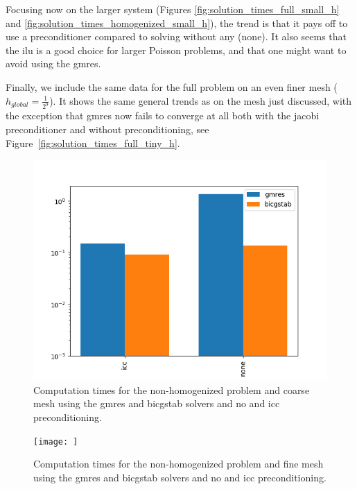 \documentclass{article}
\begin{document}
  Focusing now on the larger system (Figures \ref{fig:solution_times_full_small_h} and \ref{fig:solution_times_homogenized_small_h}), the trend is that it pays off to use a preconditioner compared to solving without any (none). It also seems that the ilu is a good choice for larger Poisson problems, and that one might want to avoid using the gmres.

  Finally, we include the same data for the full problem on an even finer mesh ($h_{global}=\frac{1}{2^9}$). It shows the same general trends as on the mesh just discussed, with the exception that gmres now fails to converge at all both with the jacobi preconditioner and without preconditioning, see Figure~\ref{fig:solution_times_full_tiny_h}. 
\begin{figure}[h]
    \centering
    \includegraphics[width=0.8\linewidth]{solution_times_icc_big_h.png}
    \caption{Computation times for the non-homogenized problem and coarse mesh using the gmres and bicgstab solvers and no and icc preconditioning.}
    \label{fig:solution_times_icc_big_h}
  \end{figure}
  \begin{figure}[h]
    \centering
    \texttt{[image: ]}%
    \caption{Computation times for the non-homogenized problem and fine mesh using the gmres and bicgstab solvers and no and icc preconditioning.}
    \label{fig:solution_times_icc_small_h}
  \end{figure}
  
\end{document}

